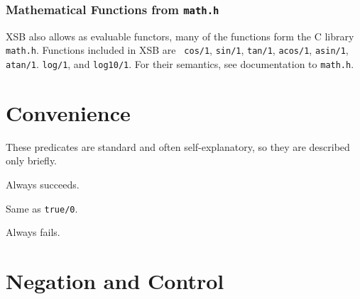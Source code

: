 \subsubsection{Mathematical Functions from {\tt math.h}}
  
  
 

XSB also allows as evaluable functors, many of the functions form the
C library {\tt math.h}.  Functions included in XSB \version{} are {\tt
cos/1}, {\tt sin/1}, {\tt tan/1}, {\tt acos/1}, {\tt asin/1}, {\tt
atan/1}. {\tt log/1}, and {\tt log10/1}.  For their semantics, see
documentation to {\tt math.h}.

\section{Convenience} \label{Convenience}
These predicates are standard and often self-explanatory, so they are 
described only briefly.
\begin{description}

    Always succeeds.

    Same as {\tt true/0}.

    Always fails.

\end{description}

\section{Negation and Control}\label{sec:control}

